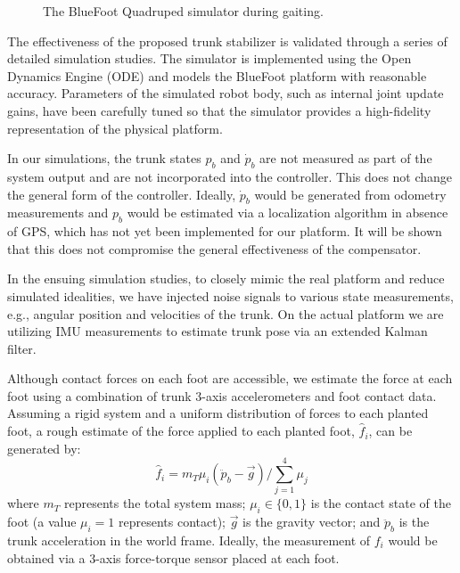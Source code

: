 	\begin{figure}[b!]\centering
		\vspace{-5mm}
		\caption{ The BlueFoot Quadruped simulator during gaiting. }
		\label{fig::bluefoot}
	\end{figure}
The effectiveness of the proposed trunk stabilizer is validated through a series of detailed simulation studies. The simulator is implemented using the Open Dynamics Engine (ODE) \cite{OpenDynamicsEngine} and models the BlueFoot platform with reasonable accuracy. Parameters of the simulated robot body, such as internal joint update gains, have been carefully tuned so that the simulator provides a high-fidelity representation of the physical platform.

In our simulations, the trunk states $p_{b}$ and $\dot{p}_{b}$ are not measured as part of the system output and are not incorporated into the controller. This does not change the general form of the controller. Ideally, $\dot{p}_{b}$ would be generated from odometry measurements and ${p}_{b}$ would be estimated via a localization algorithm in absence of GPS, which has not yet been implemented for our platform. It will be shown that this does not compromise the general effectiveness of the compensator.

In the ensuing simulation studies, to closely mimic  the real platform and reduce simulated idealities, we have injected noise signals to various state measurements, e.g., angular position and velocities of the trunk. On the actual platform we are utilizing IMU measurements to estimate trunk pose via an extended Kalman filter.


Although contact forces on each foot are accessible, we estimate the force at each foot using a combination of trunk 3-axis accelerometers and foot contact data. Assuming a rigid system and a uniform distribution of forces to each planted foot, a rough estimate of the force applied to each \Ith planted foot, $\hat{f}_{i}$, can be generated by:
	\vspace{-2mm}
	\begin{equation}
		\hat{f}_{i} = {m_{T}\mu_{i}} \left(\ddot{p}_{b} - \vec{g}\right)/{\sum_{j=1}^{4}{\mu_{j}}}
	\end{equation}
where $m_{T}$ represents the total system mass; $\mu_{i}\in \{0,1\}$ is the contact state of the \Ith foot (a value $\mu_{i}=1$ represents contact); $\vec{g}$ is the gravity vector; and $\ddot{p}_{b}$ is the trunk acceleration in the world frame. Ideally, the measurement of ${f}_{i}$ would be obtained via a 3-axis force-torque sensor placed at each foot.


